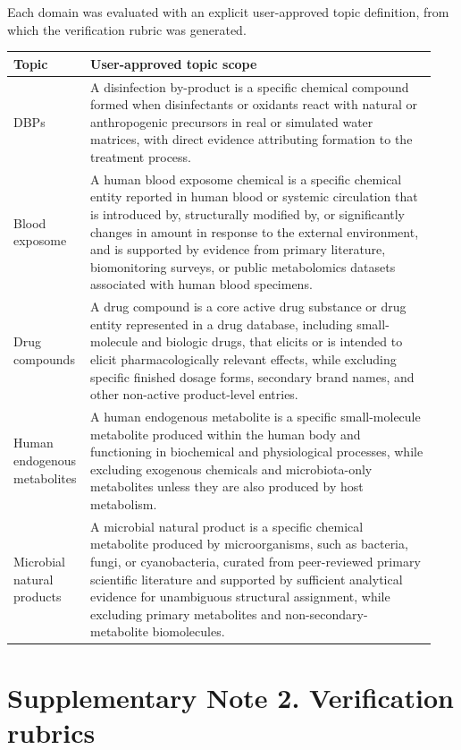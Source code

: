 \documentclass[10pt]{article}
\begin{document}
Each domain was evaluated with an explicit user-approved topic definition, from which the verification rubric was generated.

\begin{longtable}{@{}>{\raggedright\arraybackslash}p{0.14\linewidth}>{\raggedright\arraybackslash}p{0.80\linewidth}@{}}
\toprule
Topic & User-approved topic scope \\
\midrule
DBPs & A disinfection by-product is a specific chemical compound formed when disinfectants or oxidants react with natural or anthropogenic precursors in real or simulated water matrices, with direct evidence attributing formation to the treatment process. \\
Blood exposome & A human blood exposome chemical is a specific chemical entity reported in human blood or systemic circulation that is introduced by, structurally modified by, or significantly changes in amount in response to the external environment, and is supported by evidence from primary literature, biomonitoring surveys, or public metabolomics datasets associated with human blood specimens. \\
Drug compounds & A drug compound is a core active drug substance or drug entity represented in a drug database, including small-molecule and biologic drugs, that elicits or is intended to elicit pharmacologically relevant effects, while excluding specific finished dosage forms, secondary brand names, and other non-active product-level entries. \\
Human endogenous metabolites & A human endogenous metabolite is a specific small-molecule metabolite produced within the human body and functioning in biochemical and physiological processes, while excluding exogenous chemicals and microbiota-only metabolites unless they are also produced by host metabolism. \\
Microbial natural products & A microbial natural product is a specific chemical metabolite produced by microorganisms, such as bacteria, fungi, or cyanobacteria, curated from peer-reviewed primary scientific literature and supported by sufficient analytical evidence for unambiguous structural assignment, while excluding primary metabolites and non-secondary-metabolite biomolecules. \\
\bottomrule
\end{longtable}

\section*{Supplementary Note 2. Verification rubrics}
\end{document}
